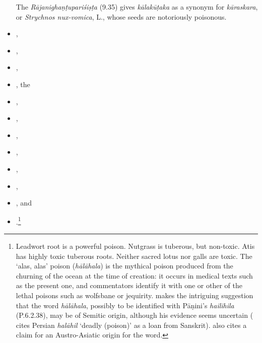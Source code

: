 \begin{translation}
\begin{itemize}
{        The \emph{Rāja\-nighaṇṭu\-pariśiṣṭa} (9.35) gives \emph{kālakūṭaka} as a
        synonym for \emph{kāras\-kara}, or \emph{Strychnos nux-vomica}, L., 
        whose
        seeds are notoriously poisonous.}
        \item {},
        \item {},
        \item {},
        \item {}, the
        \item {},
        \item {},
        \item {},
        \item {}, \item {},
        \item {}, \item {}, and \item 
            .\footnote{Leadwort root is a powerful poison.
        Nutgrass is tuberous, but non-toxic. Atis has highly toxic tuberous
        roots. Neither sacred lotus nor galls are toxic. The `alas, alas' poison
        (\emph{hālāhala}) is the mythical poison produced from the churning of
        the ocean at the time of creation: it occurs in medical texts such as
        the present one, and commentators identify it with one or other of the
        lethal poisons such as wolfsbane or jequirity.
        \citet[126]{agra-indi} makes the intriguing suggestion
        that the word \emph{hālāhala},
        possibly to be identified with Pāṇini's \emph{hailihila} (P.6.2.38),
        may be of Semitic origin, although his evidence
        seems uncertain (\citet[1506a]{stei-pers} cites Persian \emph{halāhil}
        `deadly (poison)' as a loan from Sanskrit). \cite[iii.585]{mayr-kurz}
        also cites a claim for an Austro-Asiatic origin for the word.}
            \end{itemize}


\end{translation}
